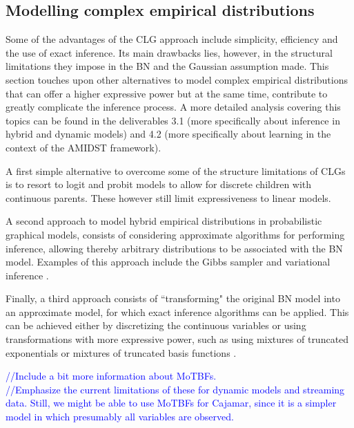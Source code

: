 \subsection{Modelling complex empirical distributions}


Some of the advantages of the CLG approach include simplicity, efficiency and the use of exact inference. Its main drawbacks lies, however, in the structural limitations they impose in the BN and the Gaussian assumption made. This section touches upon other alternatives to model complex empirical distributions that can offer a higher expressive power but at the same time, contribute to greatly complicate the inference process. A more detailed analysis covering this topics can be found in the deliverables 3.1 (more specifically about inference in hybrid and dynamic models) and 4.2 (more specifically about learning in the context of the AMIDST framework).  

A first simple alternative to overcome some of the structure limitations of CLGs is to resort to logit and probit models to allow for discrete children with continuous parents. These however still limit expressiveness to linear models.

A second approach to model hybrid empirical distributions in probabilistic graphical models, consists of considering approximate algorithms for performing inference, allowing thereby arbitrary distributions to be associated with the BN model. Examples of this approach include the Gibbs sampler \cite{Geman1984, hrycej1990gibbs} and variational inference \cite{Jordan1999}. 

Finally, a third approach consists of ``transforming" the original BN model into an approximate model, for which exact inference algorithms can be applied. This can be achieved either by discretizing the continuous variables \cite{KozlovKollerUAI97} or using transformations with more expressive power, such as using mixtures of truncated exponentials \cite{Moral2001} or mixtures of truncated basis functions \cite{Langseth12}.

\textcolor{blue}{//Include a bit more information about MoTBFs.\\}
\textcolor{blue}{//Emphasize the current limitations of these for dynamic models and streaming data. Still, we might be able to use MoTBFs for Cajamar, since it is a simpler model in which presumably all variables are observed.}


